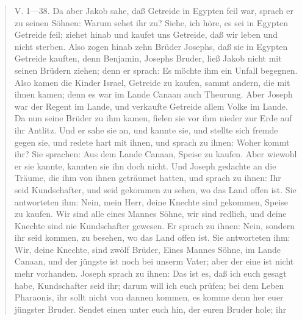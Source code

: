 \begin{quote}
V. 1—38. Da aber Jakob sahe, daß Getreide in Egypten feil war, sprach er zu seinen Söhnen: Warum sehet ihr zu? Siehe, ich höre, es sei in Egypten Getreide feil; ziehet hinab und kaufet uns Getreide, daß wir leben und nicht sterben. Also zogen hinab zehn Brüder Josephs, daß sie in Egypten Getreide kauften, denn Benjamin, Josephs Bruder, ließ Jakob nicht mit seinen Brüdern ziehen; denn er sprach: Es möchte ihm ein Unfall begegnen. Also kamen die Kinder Israel, Getreide zu kaufen, sammt andern, die mit ihnen kamen; denn es war im Lande Canaan auch Theurung. Aber Joseph war der Regent im Lande, und verkaufte Getreide allem Volke im Lande. Da nun seine Brüder zu ihm kamen, fielen sie vor ihm nieder zur Erde auf ihr Antlitz. Und er sahe sie an, und kannte sie, und stellte sich fremde gegen sie, und redete hart mit ihnen, und sprach zu ihnen: Woher kommt ihr? Sie sprachen: Aus dem Lande Canaan, Speise zu kaufen. Aber wiewohl er sie kannte, kannten sie ihn doch nicht. Und Joseph gedachte an die Träume, die ihm von ihnen geträumet hatten, und sprach zu ihnen: Ihr seid Kundschafter, und seid gekommen zu sehen, wo das Land offen ist. Sie antworteten ihm: Nein, mein Herr, deine Knechte sind gekommen, Speise zu kaufen. Wir sind alle eines Mannes Söhne, wir sind redlich, und deine Knechte sind nie Kundschafter gewesen. Er sprach zu ihnen: Nein, sondern ihr seid kommen, zu besehen, wo das Land offen ist. Sie antworteten ihm: Wir, deine Knechte, sind zwölf Brüder, Eines Mannes Söhne, im Lande Canaan, und der jüngste ist noch bei unserm Vater; aber der eine ist nicht mehr vorhanden. Joseph sprach zu ihnen: Das ist es, daß ich euch gesagt habe, Kundschafter seid ihr; darum will ich euch prüfen; bei dem Leben Pharaonis, ihr sollt nicht von dannen kommen, es komme denn her euer jüngster Bruder. Sendet einen unter euch hin, der euren Bruder hole; ihr
\end{quote}
